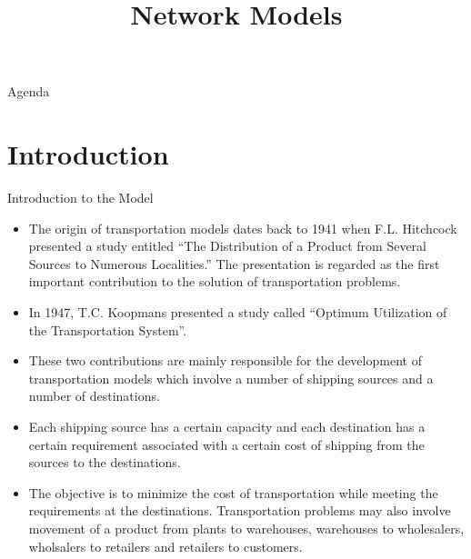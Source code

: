 \documentclass[../main.tex]{subfiles}
\title{Network Models}
\begin{document}
\begin{frame}
  \maketitle
\end{frame}


\begin{frame}{Agenda}
  \tableofcontents
\end{frame}


\section{Introduction}
\label{sec:intro}

\begin{frame}{Introduction to the Model}
  \begin{itemize} \parskip3mm \justifying
    \item<only@1> The origin of transportation models dates back to 1941 when F.L. Hitchcock presented a study entitled ``The Distribution of a Product from Several Sources to Numerous Localities.'' The presentation is regarded as the first important contribution to the solution of transportation
    problems. 
    \item<only@1> In 1947, T.C. Koopmans presented a study called ``Optimum Utilization of the Transportation System''. 
    \item<only@1> These two contributions are mainly responsible for the development of  transportation models which involve a number of shipping sources and a number of destinations.
    \item<only@2> Each shipping source has a certain capacity and each destination has a certain requirement  associated with a certain cost of shipping from the sources to the destinations. 
    \item<only@2>  The objective is to minimize the cost of transportation while meeting the requirements at the destinations. Transportation problems may also involve movement of a \alert{product from plants to warehouses, warehouses to wholesalers, wholsalers to retailers and retailers to customers.} 
    \end{itemize}
\end{frame}
\end{document}
